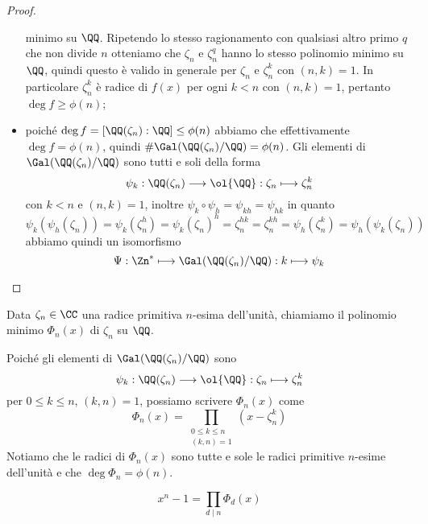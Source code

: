 \documentclass[11pt]{scrartcl}
\begin{document}
\begin{proof}
\begin{itemize}
        minimo su $\QQ$. Ripetendo lo stesso ragionamento con qualsiasi altro 
        primo $q$ che non divide $n$ otteniamo che $\zeta_n$ e $\zeta_n^q$ 
        hanno lo stesso polinomio minimo su $\QQ$, quindi questo è valido 
        in generale per $\zeta_n$ e $\zeta_n^k$ con $(n, k) = 1$. In particolare
        $\zeta_n^k$ è radice di $f(x)$ per ogni $k < n$ con $(n, k) = 1$, pertanto 
        $\deg f \geq \phi(n)$;
        \item poiché $\deg f = [\QQ(\zeta_n):\QQ] \leq \phi(n)$ abbiamo che 
        effettivamente $\deg f = \phi(n)$, quindi $\#\Gal(\QQ(\zeta_n)/\QQ) = \phi(n)$.
        Gli elementi di $\Gal(\QQ(\zeta_n)/\QQ)$ sono tutti e soli della forma
        \[
            \psi_k: \QQ(\zeta_n)\longrightarrow \ol{\QQ}: \zeta_n \longmapsto \zeta_n^k
        \]
        con $k < n$ e $(n, k) = 1$, inoltre $\psi_k\circ\psi_h = \psi_{kh} = \psi_{hk}$
        in quanto 
        \[
            \psi_k(\psi_h(\zeta_n)) = \psi_k(\zeta_n^h) = \psi_k(\zeta_n)^h =
            \zeta_n^{hk} = \zeta_n^{kh} = \psi_h(\zeta_n^k) = \psi_h(\psi_k(\zeta_n))
        \]
        abbiamo quindi un isomorfismo 
        \[
            \Psi: \Zn^* \longmapsto \Gal(\QQ(\zeta_n)/\QQ):k \longmapsto \psi_k
        \]
    \end{itemize}
\end{proof}

\begin{definition}
    Data $\zeta_n \in \CC$ una radice primitiva $n$-esima dell'unità, chiamiamo
     il polinomio minimo $\Phi_n(x)$
    di $\zeta_n$ su $\QQ$.
\end{definition}

\begin{remark}
    Poiché gli elementi di $\Gal(\QQ(\zeta_n)/\QQ)$ sono
    \[
        \psi_k: \QQ(\zeta_n) \longrightarrow \ol{\QQ}: \zeta_n \longmapsto \zeta_n^k
    \]
    per $0 \leq k \leq n$, $(k, n) = 1$, possiamo scrivere $\Phi_n(x)$ come 
    \[
        \Phi_n(x) = \prod_{\substack{0\leq k \leq n\\(k, n) = 1}}(x - \zeta_n^k)
    \]
    Notiamo che le radici di $\Phi_n(x)$ sono tutte e sole le radici primitive
    $n$-esime dell'unità e che $\deg\Phi_n = \phi(n)$.
\end{remark}

\begin{proposition}
    \[
        x^n - 1 = \prod_{d\mid n}\Phi_d(x)
    \]
\end{proposition}
\end{document}
